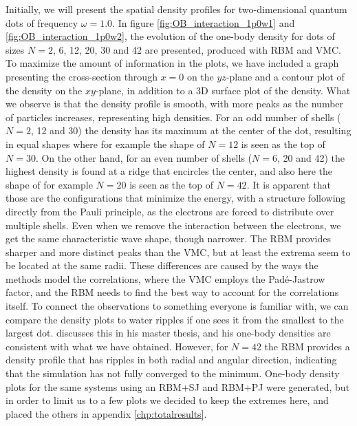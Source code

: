 Initially, we will present the spatial density profiles for two-dimensional quantum dots of frequency $\omega=1.0$. In figure \eqref{fig:OB_interaction_1p0w1} and \eqref{fig:OB_interaction_1p0w2}, the evolution of the one-body density for dots of sizes $N=2$, 6, 12, 20, 30 and 42 are presented, produced with RBM and VMC. To maximize the amount of information in the plots, we have included a graph presenting the cross-section through $x=0$ on the $yz$-plane and a contour plot of the density on the $xy$-plane, in addition to a 3D surface plot of the density. What we observe is that the density profile is smooth, with more peaks as the number of particles increases, representing high densities. For an odd number of shells ($N=2$, 12 and 30) the density has its maximum at the center of the dot, resulting in equal shapes where for example the shape of $N=12$ is seen as the top of $N=30$. On the other hand, for an even number of shells ($N=6$, 20 and 42) the highest density is found at a ridge that encircles the center, and also here the shape of for example $N=20$ is seen as the top of $N=42$. It is apparent that those are the configurations that minimize the energy, with a structure following directly from the Pauli principle, as the electrons are forced to distribute over multiple shells. Even when we remove the interaction between the electrons, we get the same characteristic wave shape, though narrower. The RBM provides sharper and more distinct peaks than the VMC, but at least the extrema seem to be located at the same radii. These differences are caused by the ways the methods model the correlations, where the VMC employs the Padé-Jastrow factor, and the RBM needs to find the best way to account for the correlations itself. To connect the observations to something everyone is familiar with, we can compare the density plots to water ripples if one sees it from the smallest to the largest dot. \citet{hogberget_quantum_2013} discusses this in his master thesis, and his one-body densities are consistent with what we have obtained. However, for $N=42$ the RBM provides a density profile that has ripples in both radial and angular direction, indicating that the simulation has not fully converged to the minimum. One-body density plots for the same systems using an RBM+SJ and RBM+PJ were generated, but in order to limit us to a few plots we decided to keep the extremes here, and placed the others in appendix \ref{chp:totalresults}.

